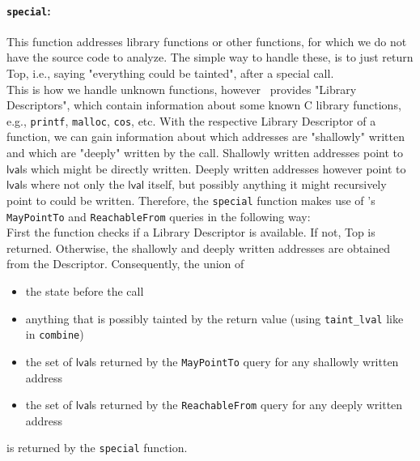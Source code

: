           \paragraph{\texttt{special}:} This function addresses library functions or other functions, for which we do not have the source code to analyze. The simple way to handle these, is to just return Top, i.e., saying "everything could be tainted", after a special call.\\
          This is how we handle unknown functions, however \gob\ provides "Library Descriptors", which contain information about some known C library functions, e.g., \texttt{printf}, \texttt{malloc}, \texttt{cos}, etc. With the respective Library Descriptor of a function, we can gain information about which addresses are "shallowly" written and which are "deeply" written by the call. Shallowly written addresses point to $\textsf{lval}$s which might be directly written. Deeply written addresses however point to $\textsf{lval}$s where not only the $\textsf{lval}$ itself, but possibly anything it might recursively point to could be written. Therefore, the \texttt{special} function makes use of \gob's \texttt{MayPointTo} and \texttt{ReachableFrom} queries in the following way:\\
          First the function checks if a Library Descriptor is available. If not, Top is returned. Otherwise, the shallowly and deeply written addresses are obtained from the Descriptor. Consequently, the union of 
          \begin{itemize}
            \item the state before the call
            \item anything that is possibly tainted by the return value (using \texttt{taint\_lval} like in \texttt{combine}) 
            \item the set of $\textsf{lval}$s returned by the \texttt{MayPointTo} query for any shallowly written address
            \item the set of $\textsf{lval}$s returned by the \texttt{ReachableFrom} query for any deeply written address
          \end{itemize}
          is returned by the \texttt{special} function.

